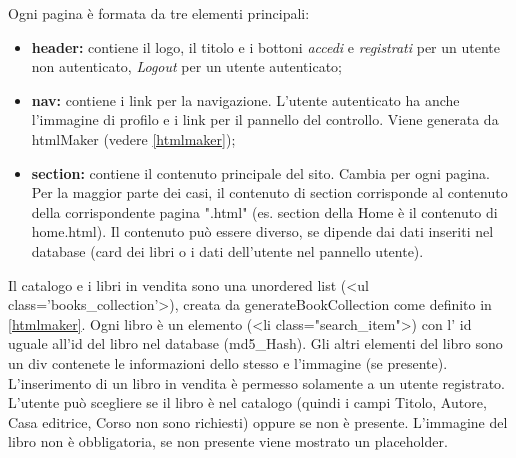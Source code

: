 Ogni pagina è formata da tre elementi principali:
\begin{itemize}
    \item \textbf{header:} contiene il logo, il titolo e i bottoni \textit{accedi} e \textit{registrati} per un utente non autenticato, \textit{Logout} per un utente autenticato;
    \item \textbf{nav:} contiene i link per la navigazione. L'utente autenticato ha anche l'immagine di profilo e i link per il pannello del controllo. Viene generata da htmlMaker (vedere \ref{htmlmaker});
    \item \textbf{section:} contiene il contenuto principale del sito. Cambia per ogni pagina. Per la maggior parte dei casi, il contenuto di section corrisponde al contenuto della corrispondente pagina ".html" (es. section della Home è il contenuto di home.html). Il contenuto può essere diverso, se dipende dai dati inseriti nel database (card dei libri o i dati dell'utente nel pannello utente).
\end{itemize}
Il catalogo e i libri in vendita sono una unordered list (<ul class='books\_collection'>), creata da generateBookCollection come definito in \ref{htmlmaker}. Ogni libro è un elemento (<li class="search\_item">) con l' id uguale all'id del libro nel database (md5\_Hash). Gli altri elementi del libro sono un div contenete le informazioni dello stesso e l'immagine (se presente).\\
L'inserimento di un libro in vendita è permesso solamente a un utente registrato. L'utente può scegliere se il libro è nel catalogo (quindi i campi Titolo, Autore, Casa editrice, Corso non sono richiesti) oppure se non è presente. L'immagine del libro non è obbligatoria, se non presente viene mostrato un placeholder.